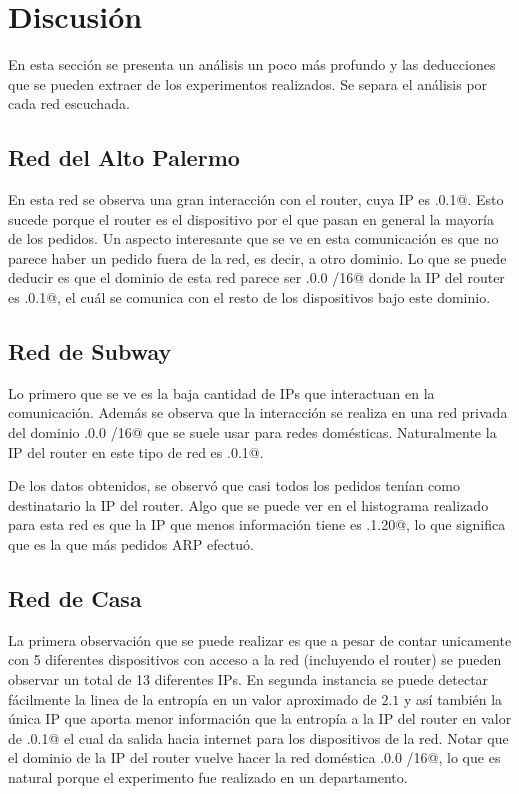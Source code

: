 \section{Discusi\'on}

En esta secci\'on se presenta un an\'alisis un poco m\'as profundo y las deducciones que se pueden 
extraer de los experimentos realizados. Se separa el an\'alisis por cada red escuchada. 

\subsection{Red del Alto Palermo}

En esta red se observa una gran interacci\'on con el router, cuya IP es .0.1@. Esto 
sucede porque el router es el dispositivo por el que pasan en general la mayor\'ia de los pedidos.
Un aspecto interesante que se ve en esta comunicaci\'on es que no parece haber un pedido fuera de
la red, es decir, a otro dominio. Lo que se puede deducir es que el dominio de esta red parece ser 
.0.0 /16@ donde la IP del router es .0.1@, el cu\'al se comunica con el
resto de los dispositivos bajo este dominio.

\subsection{Red de Subway}

Lo primero que se ve es la baja cantidad de IPs que interactuan en la comunicaci\'on. Adem\'as se
observa que la interacci\'on se realiza en una red privada del dominio .0.0 /16@ que 
se suele usar para redes dom\'esticas. Naturalmente la IP del router en este tipo de red es 
.0.1@.

De los datos obtenidos, se observ\'o que casi todos los pedidos ten\'ian como destinatario la IP
del router. Algo que se puede ver en el histograma realizado para esta red es que la IP que menos
informaci\'on tiene es .1.20@, lo que significa que es la que m\'as pedidos ARP 
efectu\'o.

\subsection{Red de Casa}

La primera observaci\'on que se puede realizar es que a pesar de contar unicamente con 5 diferentes 
dispositivos con acceso a la red (incluyendo el router) se pueden observar un total de 13 diferentes 
IPs. En segunda instancia se puede detectar f\'acilmente la linea de la entrop\'ia en un valor 
aproximado de $2.1$ y as\'i tambi\'en la \'unica IP que aporta menor informaci\'on que la entrop\'ia 
a la IP del router en valor de .0.1@ el cual da salida hacia internet para los 
dispositivos de la red. Notar que el dominio de la IP del router vuelve hacer la red dom\'estica .0.0 /16@, lo que es natural porque el experimento fue realizado en un departamento.

